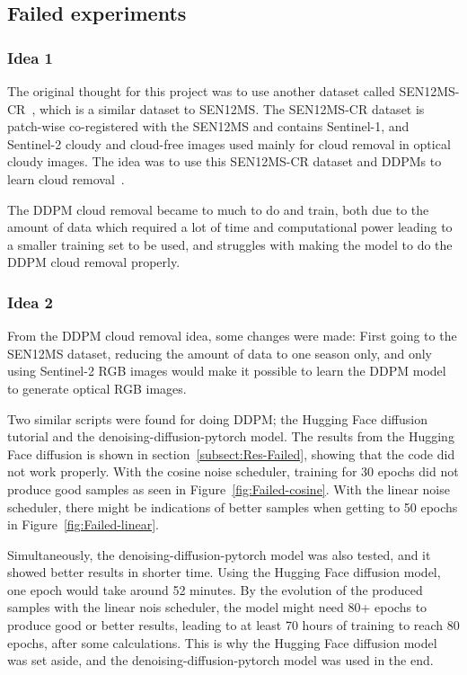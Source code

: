 \documentclass[fullpaper]{nldl}
\begin{document}
\subsection{Failed experiments}
\label{subsect:Failed Experiments}
\subsubsection{Idea 1}
\label{subsubsect:Idea1}
The original thought for this project was to use another dataset called SEN12MS-CR~\cite{sen12mscr}, which is a similar dataset to SEN12MS. The SEN12MS-CR dataset is patch-wise co-registered with the SEN12MS and contains Sentinel-1, and Sentinel-2 cloudy and cloud-free images used mainly for cloud removal in optical cloudy images. The idea was to use this SEN12MS-CR dataset and DDPMs to learn cloud removal~\cite{jing2023denoising}.

The DDPM cloud removal became to much to do and train, both due to the amount of data which required a lot of time and computational power leading to a smaller training set to be used, and struggles with making the model to do the DDPM cloud removal properly.


\subsubsection{Idea 2}
\label{subsubsect:Idea2}
From the DDPM cloud removal idea, some changes were made: First going to the SEN12MS dataset, reducing the amount of data to one season only, and only using Sentinel-2 RGB images would make it possible to learn the DDPM model to generate optical RGB images.

Two similar scripts were found for doing DDPM; the Hugging Face diffusion tutorial and the denoising-diffusion-pytorch model. The results from the Hugging Face diffusion is shown in section~\ref{subsect:Res-Failed}, showing that the code did not work properly. With the cosine noise scheduler, training for 30 epochs did not produce good samples as seen in Figure~\ref{fig:Failed-cosine}. With the linear noise scheduler, there might be indications of better samples when getting to 50 epochs in Figure~\ref{fig:Failed-linear}.

Simultaneously, the denoising-diffusion-pytorch model was also tested, and it showed better results in shorter time. Using the Hugging Face diffusion model, one epoch would take around 52 minutes. By the evolution of the produced samples with the linear nois scheduler, the model might need 80+ epochs to produce good or better results, leading to at least 70 hours of training to reach 80 epochs, after some calculations. This is why the Hugging Face diffusion model was set aside, and the denoising-diffusion-pytorch model was used in the end.
\end{document}
